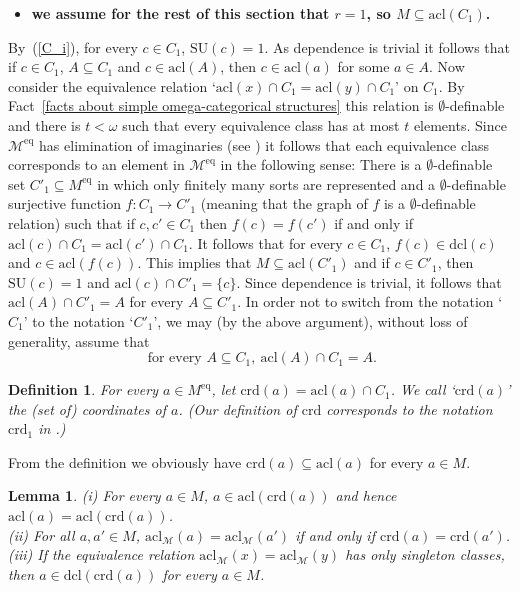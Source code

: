 \documentclass[11pt, twoside]{amsart}
\newtheorem{lem}[theor]{Lemma}
\newtheorem{defin}[theor]{Definition}
\numberwithin{equation}{section}
\newcommand{\acl}{\mathrm{acl}}
\newcommand{\dcl}{\mathrm{dcl}}
\newcommand{\es}{\emptyset}
\newcommand{\su}{\mathrm{SU}}
\newcommand{\crd}{\mathrm{crd}}
\newcommand{\meq}{^{\mathrm{eq}}}
\newcommand{\mcM}{\mathcal{M}}
\begin{document}
\begin{itemize}
\item[] {\bf we assume for the rest of this section that $r = 1$, so $M \subseteq \acl(C_1)$.}
\end{itemize}

\noindent
By~(\ref{C_i}),  for every $c \in C_1$, $\su(c) = 1$.
As dependence is trivial it follows that if $c \in C_1$, $A \subseteq C_1$ and $c \in \acl(A)$, then $c \in \acl(a)$ for some $a \in A$.
Now consider the equivalence relation `$\acl(x) \cap C_1 = \acl(y) \cap C_1$' on $C_1$.
By Fact~\ref{facts about simple omega-categorical structures} this relation is $\es$-definable and there is $t < \omega$ such
that every equivalence class has at most $t$ elements.
Since $\mcM\meq$ has elimination of imaginaries (see \cite{Hod, She})
it follows  that each equivalence class corresponds
to an element in $\mcM\meq$ in the following sense:
There is a $\es$-definable set $C'_1 \subseteq M\meq$ in which only finitely many sorts are represented 
and a $\es$-definable surjective function $f : C_1 \to C'_1$ (meaning that the graph of $f$
is a $\es$-definable relation) such that if $c, c' \in C_1$ then $f(c) = f(c')$ if and only if $\acl(c) \cap C_1 = \acl(c') \cap C_1$.
It follows that for every $c \in C_1$, $f(c) \in \dcl(c)$ and $c \in \acl(f(c))$.
This implies that $M \subseteq \acl(C'_1)$ and if $c \in C'_1$, then $\su(c) = 1$ and $\acl(c) \cap C'_1 = \{c\}$. 
Since dependence is trivial, it follows that $\acl(A) \cap C'_1 = A$ for every $A \subseteq C'_1$.
In order not to switch from the notation `$C_1$' to the notation `$C'_1$', we may (by the above argument), without loss of generality, assume that
\begin{equation}\label{C_1 is a trivial geometry}
\text{ for every } A \subseteq C_1, \ \acl(A) \cap C_1 = A.
\end{equation}

\begin{defin}\label{definition of crd}{\rm
For every $a \in M\meq$, let $\crd(a) = \acl(a) \cap C_1$. We call `$\crd(a)$' the (set of) {\em coordinates} of $a$.
(Our definition of $\crd$ corresponds to the notation $\crd_1$ in \cite{Djo06}.)
}\end{defin}

\noindent
From the definition we obviously have  $\crd(a) \subseteq \acl(a)$ for every $a \in M$.

\begin{lem}\label{every element is in dcl of its coordinates}
(i) For every $a \in M$, $a \in \acl(\crd(a))$ and hence $\acl(a) = \acl(\crd(a))$.\\
(ii) For all $a, a' \in M$, $\acl_\mcM(a) = \acl_\mcM(a')$ if and only if $\crd(a) = \crd(a')$.\\
(iii) If the equivalence relation $\acl_\mcM(x) = \acl_\mcM(y)$ has only singleton classes, 
then $a \in \dcl(\crd(a))$ for every $a \in M$.
\end{lem}
\end{document}
